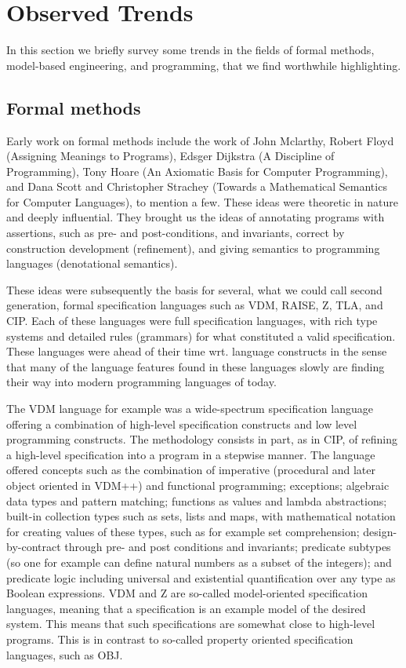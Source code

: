 
\section{Observed Trends}
\label{sec:trends}

In this section we briefly survey some trends in the fields of
formal methods, model-based engineering, and programming, that we find worthwhile highlighting.


\subsection{Formal methods}

Early work on formal methods include the work of John Mclarthy, 
Robert Floyd (Assigning Meanings to Programs), Edsger Dijkstra (A 
Discipline of Programming), Tony Hoare (An Axiomatic Basis for 
Computer Programming), and Dana Scott and Christopher Strachey 
(Towards a Mathematical Semantics for Computer Languages), to 
mention a few. These ideas were theoretic in nature and deeply 
influential. They brought us the ideas of  annotating programs with 
assertions, such as pre- and post-conditions, and invariants, 
correct by construction development (refinement), and giving 
semantics to programming languages (denotational semantics). 

These ideas were subsequently the basis for several, what we could 
call second generation, formal specification languages such as VDM, 
RAISE, Z, TLA, and CIP. Each of these languages were full 
specification languages, with rich type systems and detailed rules 
(grammars) for what constituted a valid specification. These 
languages were ahead of their time wrt. language constructs in the 
sense that many of the language features found in these languages 
slowly are finding their way into modern programming languages of 
today. 

The VDM language for example was a wide-spectrum specification 
language offering a combination of high-level specification 
constructs and low level programming constructs. The methodology 
consists in part, as in CIP, of refining a high-level specification 
into a program in a stepwise manner. The language offered concepts 
such as the combination of imperative (procedural and later object 
oriented in VDM++) and functional programming; exceptions; 
algebraic data types and pattern matching; functions as values and 
lambda abstractions; built-in collection types such as sets, lists 
and maps, with mathematical notation for creating values of these 
types, such as for example set comprehension; design-by-contract 
through pre- and post conditions and invariants; predicate subtypes 
(so one for example can define natural numbers as a subset of the 
integers);  and predicate logic including universal and existential 
quantification over any type as Boolean expressions.  VDM and Z are 
so-called model-oriented specification languages, meaning that a 
specification is an example model of the desired system. This means 
that such specifications are somewhat close to high-level programs. 
This is in contrast to so-called property oriented specification 
languages, such as OBJ.  

